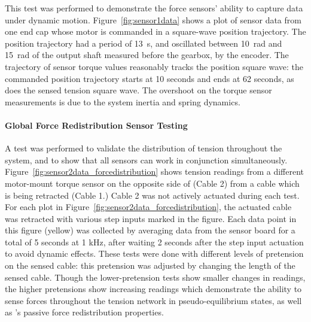 \begin{appendices}
This test was performed to demonstrate the force sensors' ability to capture data under dynamic motion.
Figure~\ref{fig:sensor1data} shows a plot of sensor data from one end cap whose motor is commanded in a square-wave position trajectory.
The position trajectory had a period of \SI{13}{\second}, and oscillated between \SI{10}{\radian} and \SI{15}{\radian} of the output shaft measured before the gearbox, by the encoder.
The trajectory of sensor torque values reasonably tracks the position square wave: the commanded position trajectory starts at 10 seconds and ends at 62 seconds, as does the sensed tension square wave.
The overshoot on the torque sensor measurements is due to the system inertia and spring dynamics.

\paragraph{Global Force Redistribution Sensor Testing}

A test was performed to validate the distribution of tension throughout the system, and to show that all sensors can work in conjunction simultaneously.
Figure~\ref{fig:sensor2data_forcedistribution} shows tension readings from a different motor-mount torque sensor on the opposite side of \SB{} (Cable 2) from a cable which is being retracted (Cable 1.)
Cable 2 was not actively actuated during each test.
For each plot in Figure~\ref{fig:sensor2data_forcedistribution}, the actuated cable was retracted with various step inputs marked in the figure.
Each data point in this figure (yellow) was collected by averaging data from the sensor board for a total of 5 seconds at 1 kHz, after waiting 2 seconds after the step input actuation to avoid dynamic effects.
These tests were done with different levels of pretension on the sensed cable: this pretension was adjusted by changing the length of the sensed cable.
Though the lower-pretension tests show smaller changes in readings, the higher pretensions show increasing readings which demonstrate the ability to sense forces throughout the tension network in pseudo-equilibrium states, as well as \SB{}'s passive force redistribution properties.


\end{appendices}
